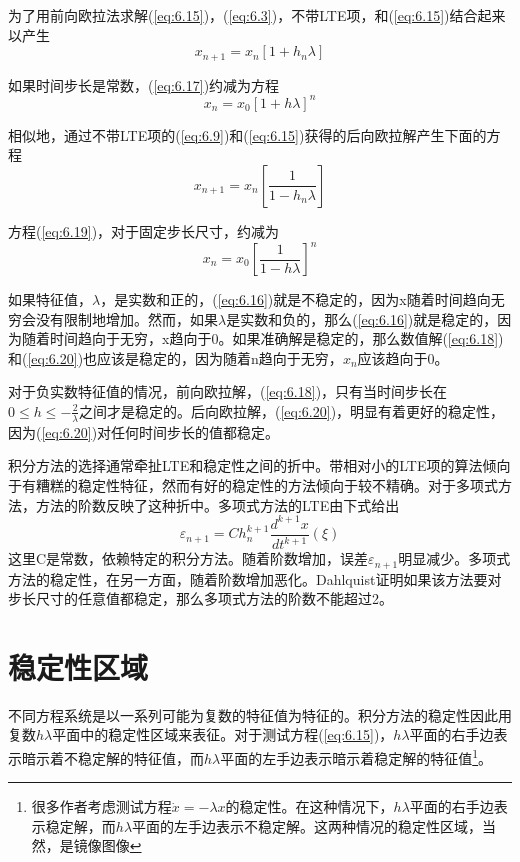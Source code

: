为了用前向欧拉法求解(\ref{eq:6.15})，(\ref{eq:6.3})，不带LTE项，和(\ref{eq:6.15})结合起来以产生
\begin{equation}
    x_{n+1} = x_n[1 + h_n \lambda]
    \label{eq:6.17}
\end{equation}

如果时间步长是常数，(\ref{eq:6.17})约减为方程
\begin{equation}
    x_n = x_0[1 + h\lambda]^n
    \label{eq:6.18}
\end{equation}

相似地，通过不带LTE项的(\ref{eq:6.9})和(\ref{eq:6.15})获得的后向欧拉解产生下面的方程
\begin{equation}
    x_{n+1} = x_n[\frac{1}{1-h_n \lambda}]
    \label{eq:6.19}
\end{equation}

方程(\ref{eq:6.19})，对于固定步长尺寸，约减为
\begin{equation}
    x_n = x_0 [\frac{1}{1-h\lambda}]^n
    \label{eq:6.20}
\end{equation}

如果特征值，$\lambda$，是实数和正的，(\ref{eq:6.16})就是不稳定的，因为x随着时间趋向无穷会没有限制地增加。然而，如果$\lambda$是实数和负的，那么(\ref{eq:6.16})就是稳定的，因为随着时间趋向于无穷，x趋向于0。如果准确解是稳定的，那么数值解(\ref{eq:6.18})和(\ref{eq:6.20})也应该是稳定的，因为随着n趋向于无穷，$x_n$应该趋向于0。

对于负实数特征值的情况，前向欧拉解，(\ref{eq:6.18})，只有当时间步长在$0 \leq h \leq -\frac{2}{\lambda}$之间才是稳定的。后向欧拉解，(\ref{eq:6.20})，明显有着更好的稳定性，因为(\ref{eq:6.20})对任何时间步长的值都稳定。

积分方法的选择通常牵扯LTE和稳定性之间的折中。带相对小的LTE项的算法倾向于有糟糕的稳定性特征，然而有好的稳定性的方法倾向于较不精确。对于多项式方法，方法的阶数反映了这种折中。多项式方法\cite{ref-37,ref-64}的LTE由下式给出
\begin{equation}
    \varepsilon_{n+1} = Ch^{k+1}_n\frac{d^{k+1}x}{dt^{k+1}}(\xi)
    \label{eq:6.21}
\end{equation}
这里C是常数，依赖特定的积分方法。随着阶数增加，误差$\varepsilon_{n+1}$明显减少。多项式方法的稳定性，在另一方面，随着阶数增加恶化。Dahlquist证明如果该方法要对步长尺寸的任意值都稳定，那么多项式方法的阶数不能超过2\cite{ref-63}。

\section{稳定性区域}
不同方程系统是以一系列可能为复数的特征值为特征的。积分方法的稳定性因此用复数$h\lambda$平面中的稳定性区域来表征。对于测试方程(\ref{eq:6.15})，$h \lambda$平面的右手边表示暗示着不稳定解的特征值，而$h \lambda$平面的左手边表示暗示着稳定解的特征值\footnote{很多作者考虑测试方程$\dot{x} = -\lambda x$的稳定性。在这种情况下，$h\lambda$平面的右手边表示稳定解，而$h\lambda$平面的左手边表示不稳定解。这两种情况的稳定性区域，当然，是镜像图像}。


